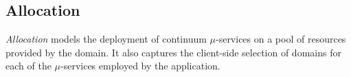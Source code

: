 




\subsection{Allocation}\label{sec:A3-E-allocation}



\textit{Allocation} models the deployment of continuum $\mu$-services on a pool of resources provided by the domain. It also captures the client-side selection of domains for each of the $\mu$-services employed by the application.


